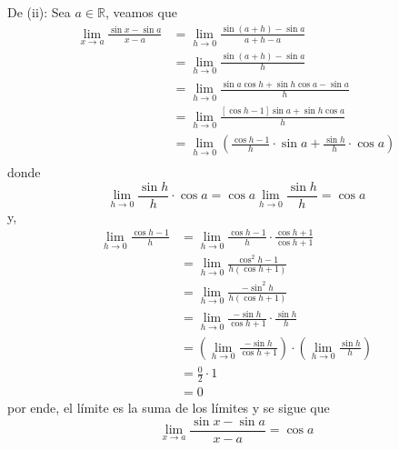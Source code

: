 \documentclass[12pt]{article}
\begin{document}
\begin{enumerate}
\begin{sol}
        De (ii): Sea $a\in\mathbb{R}$, veamos que
        \begin{equation*}
            \begin{split}
                \lim_{x\rightarrow a}\frac{\sin x-\sin a}{x-a}&=\lim_{h\rightarrow 0}\frac{\sin (a+h)-\sin a}{a+h-a}\\
                &=\lim_{h\rightarrow 0}\frac{\sin (a+h)-\sin a}{h}\\
                &=\lim_{h\rightarrow 0}\frac{\sin a\cos h+\sin h\cos a -\sin a}{h}\\
                &=\lim_{h\rightarrow 0}\frac{[\cos h-1]\sin a +\sin h\cos a}{h}\\
                &=\lim_{h\rightarrow 0}\left(\frac{\cos h-1}{h}\cdot\sin a+\frac{\sin h}{h}\cdot\cos a\right) \\
            \end{split}
        \end{equation*}
        donde
        \begin{equation*}
            \lim_{ h\rightarrow0}\frac{\sin h}{h}\cdot\cos a=\cos a\lim_{ h\rightarrow0}\frac{\sin h}{h}=\cos a
        \end{equation*}
        y,
        \begin{equation*}
            \begin{split}
                \lim_{h\rightarrow 0}\frac{\cos h-1}{h}&=\lim_{h\rightarrow 0}\frac{\cos h-1}{h}\cdot\frac{\cos h+1}{\cos h+1}\\
                &=\lim_{h\rightarrow 0}\frac{\cos^2 h-1}{h(\cos h+1)}\\
                &=\lim_{h\rightarrow 0}\frac{-\sin^2 h}{h(\cos h+1)}\\
                &=\lim_{h\rightarrow 0}\frac{-\sin h}{\cos h+1}\cdot\frac{\sin h}{h}\\
                &=\left(\lim_{h\rightarrow 0}\frac{-\sin h}{\cos h+1}\right)\cdot\left(\lim_{h\rightarrow 0}\frac{\sin h}{h}\right)\\
                &=\frac{0}{2}\cdot 1\\
                &=0
            \end{split}
        \end{equation*}
        por ende, el límite es la suma de los límites y se sigue que 
        \begin{equation*}
            \lim_{x\rightarrow a}\frac{\sin x-\sin a}{x-a}=\cos a
        \end{equation*}


\end{sol}
\end{enumerate}
\end{document}
